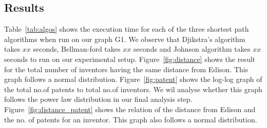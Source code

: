 \subsection{Results}
Table~\ref{tab:algos} shows the execution time for each of the three shortest path algorithms 
when run on our graph G1. We observe that Djikstra's algorithm takes $xx$ seconds, Bellman-ford takes
$xx$ seconds and Johnson algorithm takes $xx$ seconds to run on our experimental setup.
Figure~\ref{fig:distance} shows the result for the total number of inventors having the same
distance from Edison. This graph follows a normal distribution. Figure~\ref{fig:patent} shows the log-log graph of the total no.of patents
to total no.of inventors. We wil analyse whether this graph follows the power law distribution in our 
final analysis step. Figure~\ref{fig:distance_patent} shows the relation of the distance from Edison and
the no. of patents for an inventor. This graph also follows a normal distribution.



